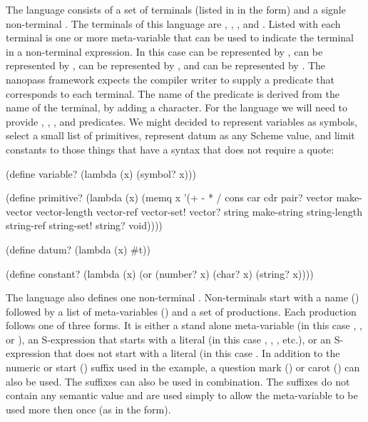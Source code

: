 \documentclass[letterpaper,10pt]{article}
\begin{document}
The  language consists of a set of terminals (listed in in the
 form) and a signle non-terminal .
The terminals of this language are , ,
, and .
Listed with each terminal is one or more meta-variable that can be used to
indicate the terminal in a non-terminal expression.
In this case  can be represented by ,
 can be represented by ,  can be
represented by , and  can be represented by
.
The nanopass framework expects the compiler writer to supply a predicate that
corresponds to each terminal.
The name of the predicate is derived from the name of the terminal, by adding a
 character.
For the  language we will need to provide ,
, , and  predicates.
We might decided to represent variables as symbols, select a small list of
primitives, represent datum as any Scheme value, and limit constants to those
things that have a syntax that does not require a quote:

\begin{schemedisplay}
(define variable?
  (lambda (x)
    (symbol? x)))

(define primitive?
  (lambda (x)
    (memq x '(+ - * / cons car cdr pair? vector make-vector vector-length
              vector-ref vector-set! vector? string make-string
              string-length string-ref string-set! string? void))))

(define datum?
  (lambda (x)
    #t))

(define constant?
  (lambda (x)
    (or (number? x)
        (char? x)
        (string? x))))
\end{schemedisplay}

The  language also defines one non-terminal .
Non-terminals start with a name () followed by a list of
meta-variables () and a set of productions.
Each production follows one of three forms.
It is either a stand alone meta-variable (in this case , ,
or ), an S-expression that starts with a literal (in this case
, , , etc.), or
an S-expression that does not start with a literal (in this case
.
In addition to the numeric or start (\scheme{*}) suffix used in the example, a
question mark () or carot (\scheme{^}) can also be used.
The suffixes can also be used in combination.
The suffixes do not contain any semantic value and are used simply to allow the
meta-variable to be used more then once (as in the 
form).
\end{document}
